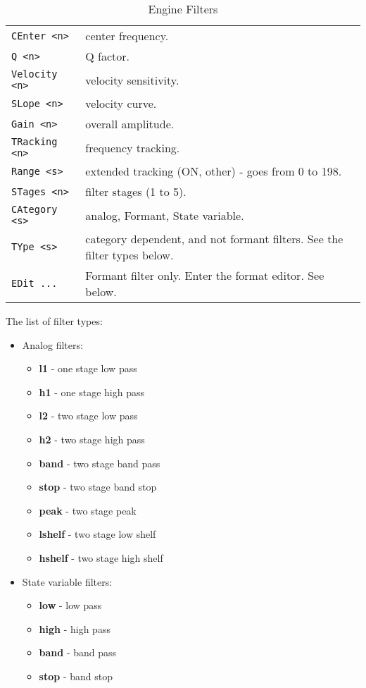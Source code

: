    \begin{table}[H]
      \centering
      \caption{Engine Filters}
      \label{table:yoshimi_engine_filters}
      \begin{tabular}{l l}
\texttt{CEnter <n>} &
   center frequency. \\
\texttt{Q <n>} &
   Q factor.   \\
\texttt{Velocity <n>} &
   velocity sensitivity.   \\
\texttt{SLope <n>} &
   velocity curve.   \\
\texttt{Gain <n>} &
   overall amplitude.   \\
\texttt{TRacking <n>} &
   frequency tracking.  \\
\texttt{Range <s>} &
   extended tracking (ON, {other}) - goes from 0 to 198. \\
\texttt{STages <n>} &
   filter stages (1 to 5). \\
\texttt{CAtegory <s>} &
   analog, Formant, State variable. \\
\texttt{TYpe <s>} &
   category dependent, and not formant filters.
   See the filter types below.   \\
\texttt{EDit ...} &
   Formant filter only. Enter the format editor. See below.   \\
      \end{tabular}
   \end{table}

   The list of filter types:

   \begin{itemize}
      \item Analog filters:
      \begin{itemize}
          \item \textbf{l1} - one stage low pass
          \item \textbf{h1} - one stage high pass
          \item \textbf{l2} - two stage low pass
          \item \textbf{h2} - two stage high pass
          \item \textbf{band} - two stage band pass
          \item \textbf{stop} - two stage band stop
          \item \textbf{peak} - two stage peak
          \item \textbf{lshelf} - two stage low shelf
          \item \textbf{hshelf} - two stage high shelf
      \end{itemize}
      \item State variable filters:
      \begin{itemize}
         \item \textbf{low} - low pass
         \item \textbf{high} - high pass
         \item \textbf{band} - band pass
         \item \textbf{stop} - band stop
      \end{itemize}
   \end{itemize}

